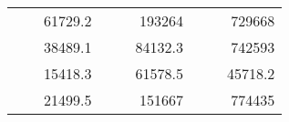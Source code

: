 \begin{table}[H]
\begin{tabular}{|ccrccrccc}
\rowcolor[HTML]{DDFDFF} 
\multicolumn{1}{|c|}{\cellcolor[HTML]{FFFFC7}}                                & \multicolumn{1}{c|}{\cellcolor[HTML]{DDFDFF}}                      & \multicolumn{1}{r|}{\cellcolor[HTML]{DAE8FC}61729.2}   & \multicolumn{1}{c|}{\cellcolor[HTML]{FFFFC7}}                                & \multicolumn{1}{c|}{\cellcolor[HTML]{DDFDFF}}                       & \multicolumn{1}{r|}{\cellcolor[HTML]{DDFDFF}193264}    & \multicolumn{1}{c|}{\cellcolor[HTML]{FFFFC7}}                                & \multicolumn{1}{c|}{\cellcolor[HTML]{DDFDFF}}                      & \multicolumn{1}{r|}{\cellcolor[HTML]{DDFDFF}729668}    \\ \cline{3-3} \cline{6-6} \cline{9-9} 
\multicolumn{1}{|c|}{\cellcolor[HTML]{FFFFC7}}                                & \multicolumn{1}{c|}{\cellcolor[HTML]{DDFDFF}}                      & \multicolumn{1}{r|}{\cellcolor[HTML]{DDFDFF}38489.1}   & \multicolumn{1}{c|}{\cellcolor[HTML]{FFFFC7}}                                & \multicolumn{1}{c|}{\cellcolor[HTML]{DDFDFF}}                       & \multicolumn{1}{r|}{\cellcolor[HTML]{DAE8FC}84132.3}   & \multicolumn{1}{c|}{\cellcolor[HTML]{FFFFC7}}                                & \multicolumn{1}{c|}{\cellcolor[HTML]{DDFDFF}}                      & \multicolumn{1}{r|}{\cellcolor[HTML]{DAE8FC}742593}    \\ \cline{3-3} \cline{6-6} \cline{9-9} 
\rowcolor[HTML]{DDFDFF} 
\multicolumn{1}{|c|}{\cellcolor[HTML]{FFFFC7}}                                & \multicolumn{1}{c|}{\cellcolor[HTML]{DDFDFF}}                      & \multicolumn{1}{r|}{\cellcolor[HTML]{DAE8FC}15418.3}   & \multicolumn{1}{c|}{\cellcolor[HTML]{FFFFC7}}                                & \multicolumn{1}{c|}{\cellcolor[HTML]{DDFDFF}}                       & \multicolumn{1}{r|}{\cellcolor[HTML]{DDFDFF}61578.5}   & \multicolumn{1}{c|}{\cellcolor[HTML]{FFFFC7}}                                & \multicolumn{1}{c|}{\cellcolor[HTML]{DDFDFF}}                      & \multicolumn{1}{r|}{\cellcolor[HTML]{DDFDFF}45718.2}   \\ \cline{3-3} \cline{6-6} \cline{9-9} 
\multicolumn{1}{|c|}{\cellcolor[HTML]{FFFFC7}}                                & \multicolumn{1}{c|}{\cellcolor[HTML]{DDFDFF}}                      & \multicolumn{1}{r|}{\cellcolor[HTML]{DDFDFF}21499.5}   & \multicolumn{1}{c|}{\cellcolor[HTML]{FFFFC7}}                                & \multicolumn{1}{c|}{\cellcolor[HTML]{DDFDFF}}                       & \multicolumn{1}{r|}{\cellcolor[HTML]{DAE8FC}151667}    & \multicolumn{1}{c|}{\cellcolor[HTML]{FFFFC7}}                                & \multicolumn{1}{c|}{\cellcolor[HTML]{DDFDFF}}                      & \multicolumn{1}{r|}{\cellcolor[HTML]{DAE8FC}774435}    \\ \cline{3-3} \cline{6-6} \cline{9-9} 

\end{tabular}
\end{table}

